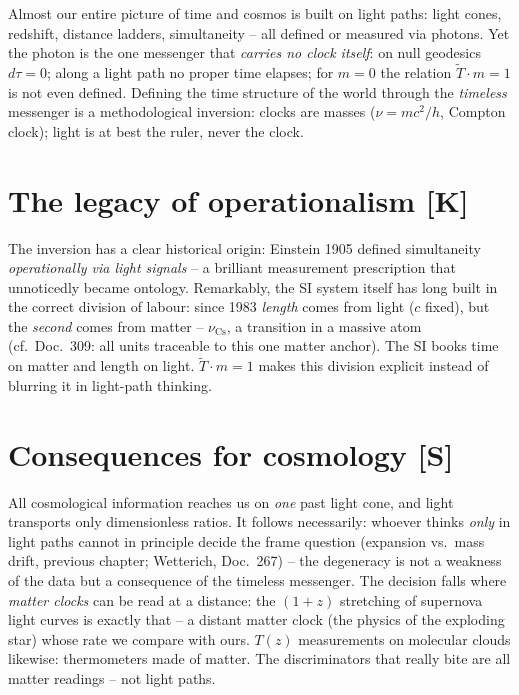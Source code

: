 \documentclass[11pt]{report}
\begin{document}
Almost our entire picture of time and cosmos is built on light
paths: light cones, redshift, distance ladders, simultaneity -- all
defined or measured via photons. Yet the photon is the one
messenger that \emph{carries no clock itself}: on null geodesics
$d\tau = 0$; along a light path no proper time elapses; for
$m = 0$ the relation $\tilde T \cdot m = 1$ is not even defined.
Defining the time structure of the world through the
\emph{timeless} messenger is a methodological inversion: clocks
are masses ($\nu = mc^2/h$, Compton clock); light is at best the
ruler, never the clock.

\section{The legacy of operationalism [K]}

The inversion has a clear historical origin: Einstein 1905 defined
simultaneity \emph{operationally via light signals} -- a brilliant
measurement prescription that unnoticedly became ontology.
Remarkably, the SI system itself has long built in the correct
division of labour: since 1983 \emph{length} comes from light
($c$ fixed), but the \emph{second} comes from matter --
$\nu_\text{Cs}$, a transition in a massive atom (cf.\ Doc.~309:
all units traceable to this one matter anchor). The SI books time
on matter and length on light. $\tilde T \cdot m = 1$ makes this
division explicit instead of blurring it in light-path thinking.

\section{Consequences for cosmology [S]}

All cosmological information reaches us on \emph{one} past light
cone, and light transports only dimensionless ratios. It follows
necessarily: whoever thinks \emph{only} in light paths cannot in
principle decide the frame question (expansion vs.\ mass drift,
previous chapter; Wetterich, Doc.~267) -- the degeneracy is not a
weakness of the data but a consequence of the timeless messenger.
The decision falls where \emph{matter clocks} can be read at a
distance: the $(1+z)$ stretching of supernova light curves is
exactly that -- a distant matter clock (the physics of the
exploding star) whose rate we compare with ours. $T(z)$
measurements on molecular clouds likewise: thermometers made of
matter. The discriminators that really bite are all matter
readings -- not light paths.
\end{document}
